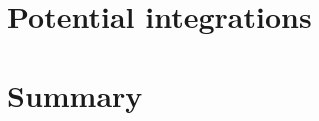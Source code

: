 \section{Potential integrations}\label{sec:opal-potential-integrations}


%

\section{Summary}\label{sec:opal-summary}

%

%
%

